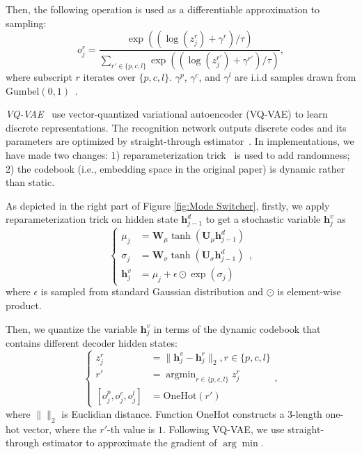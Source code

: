 \documentclass[letterpaper]{article} %
\begin{document}
Then, the following operation is used as a differentiable approximation to sampling:
\begin{equation}
o_j^r = \frac{\exp((\log(z_j^r) + \gamma^r) / \tau)}{\sum_{r' \in \{p, c, l\}} \exp((\log(z_j^{r'}) + \gamma^{r'}) / \tau)},
\end{equation}
where subscript $r$ iterates over $\{p, c, l\}$. $\gamma^p$, $\gamma^c$, and $\gamma^l$ are i.i.d  samples drawn from $\mathrm{Gumbel}(0, 1)$~\citep{gumbel1948statistical}.

\textit{VQ-VAE}~\citep{van2017neural} use vector-quantized variational autoencoder (VQ-VAE) to learn discrete representations. The recognition network outputs discrete codes and its parameters are optimized by straight-through estimator~\citep{bengio2013estimating}. In implementations, we have made two changes: 1) reparameterization trick~\citep{kingma2013auto} is used to add randomness; 2) the codebook (i.e., embedding space in the original paper) is dynamic rather than static.

As depicted in the right part of Figure \ref{fig:Mode Switcher}, firstly, we apply reparameterization trick on hidden state $\mathbf{h}^d_{j-1}$ to get a stochastic variable $\mathbf{h}^v_j$ as
\begin{equation}
\left\{\begin{aligned}
\mu_j & = \mathbf{W}_{\mu}\tanh(\mathbf{U}_{\mu}\mathbf{h}^d_{j-1}) \\
\sigma_j & = \mathbf{W}_{\sigma}\tanh(\mathbf{U}_{\sigma}\mathbf{h}^d_{j-1}) \\
\mathbf{h}^v_j & = \mu_j + \epsilon \odot \exp(\sigma_j)
\end{aligned}\right.,
\end{equation}
where $\epsilon$ is sampled from standard Gaussian distribution and $\odot$ is element-wise product.

Then, we quantize the variable $\mathbf{h}^v_j$ in terms of the dynamic codebook that contains different decoder hidden states:
\begin{equation}
\left\{\begin{aligned}
z_j^r & = \| \mathbf{h}^v_j  - \mathbf{h}^r_j  \|_2, r \in \{p, c, l\} \\
r' & = \mathop{\arg\min}_{r \in \{p, c, l\}} z_j^r \\
[ o_j^p, o_j^c, o_j^l ] & = \mathrm{OneHot}(r')
\end{aligned}\right.,
\end{equation}
where $\|\|_2$ is Euclidian distance. Function $\mathrm{OneHot}$ constructs a $3$-length one-hot vector, where the $r'$-th value is $1$. Following VQ-VAE, we use straight-through estimator to approximate the gradient of $\arg\min$.
\end{document}

